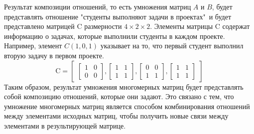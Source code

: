 \documentclass{article}
\begin{document}
Результат композиции отношений, то есть умножения матриц $A$ и $B$, будет представлять отношение "студенты выполняют задачи в проектах"\ и будет представлено матрицей C размерности $4 \times 2 \times 2$. Элементы матрицы C содержат информацию о задачах, которые выполнили студенты в каждом проекте. Например, элемент $C(1, 0, 1)$ указывает на то, что первый студент выполнил вторую задачу в первом проекте.
\[
\text{C} = \begin{bmatrix}
      \begin{bmatrix}
        1 & 0 \\
        0 & 0
      \end{bmatrix}, 
      \begin{bmatrix} 
        1 & 1 \\
        1 & 1
      \end{bmatrix},
      \begin{bmatrix}
        0 & 0 \\
        1 & 1
      \end{bmatrix}, 
      \begin{bmatrix}
        1 & 1 \\
        1 & 1
      \end{bmatrix}
\end{bmatrix}
\] 
Таким образом, результат умножения многомерных матриц будет представлять собой композицию отношений, которые они задают. Это связано с тем, что умножение многомерных матриц является способом комбинирования отношений между элементами исходных матриц, чтобы получить новые связи между элементами в результирующей матрице.
\end{document}
